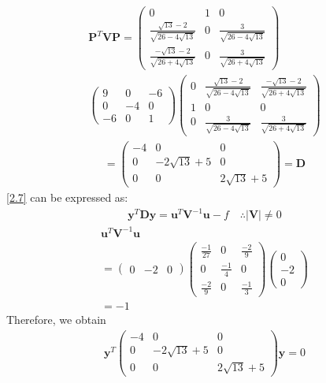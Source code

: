 \documentclass[journal,12pt,twocolumn]{IEEEtran}
\let\vec\mathbf
\numberwithin{equation}{subsection}
\newcommand{\myvec}[1]{\ensuremath{\begin{pmatrix}#1\end{pmatrix}}}
\begin{document}
\begin{enumerate}
\begin{enumerate}
\begin{multline}
\vec{P}^T\vec{V}\vec{P}= \myvec{0&1&0\\
\frac{\sqrt{13} -2}{\sqrt{26-4\sqrt{13}}}&0&\frac{3}{\sqrt{26-4\sqrt{13}}}\\
\frac{-\sqrt{13} -2}{\sqrt{26+4\sqrt{13}}}&0&\frac{3}{\sqrt{26+4\sqrt{13}}}
}  \\ \myvec{9&0&-6\\0&-4&0\\-6&0&1}   
\myvec{0 &\frac{\sqrt{13} -2}{\sqrt{26-4\sqrt{13}}}&\frac{-\sqrt{13} -2}{\sqrt{26+4\sqrt{13}}}\\1 &0&0\\0&\frac{3}{\sqrt{26-4\sqrt{13}}}&\frac{3}{\sqrt{26+4\sqrt{13}}}}
\end{multline}
\begin{align}
=\myvec{-4&0&0\\0&-2\sqrt{13}+5&0\\0&0&2\sqrt{13}+5} = \vec{D}
\end{align}
 \eqref{2.7}  can be expressed as:
\begin{align}
\vec{y}^T\vec{D}\vec{y} = \vec{u}^T\vec{V}^{-1}\vec{u} -f   \quad     \wasytherefore |\vec{V}| \neq 0
\end{align}
\begin{multline}
\vec{u}^T\vec{V}^{-1}\vec{u} \\= \myvec{0&-2&0} \myvec{\frac{-1}{27} & 0 &\frac{-2}{9}\\ 0 & \frac{-1}{4} & 0 \\ \frac{-2}{9} & 0 &\frac{-1}{3}}\myvec{0\\-2\\0}\\=-1
\end{multline}
Therefore, we obtain
\begin{align}
\vec{y}^T\myvec{-4&0&0\\0&-2\sqrt{13}+5&0\\0&0&2\sqrt{13}+5}\vec{y} = 0  
\end{align}

\end{enumerate}


\end{enumerate}
\end{document}

